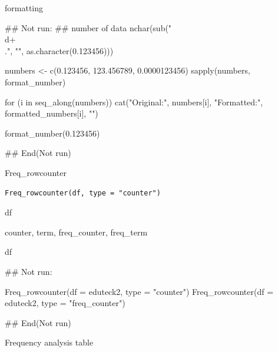 \documentclass[a4paper]{book}
\begin{document}
%
\begin{Value}
formatting
\end{Value}
%
\begin{Examples}
\begin{ExampleCode}
\#\# Not run: 
## number of data
nchar(sub("\\d+\\.", "", as.character(0.123456)))

numbers <- c(0.123456, 123.456789, 0.0000123456)
sapply(numbers, format_number)

for (i in seq_along(numbers)) {
   cat("Original:", numbers[i], "Formatted:", formatted_numbers[i], "\n")}

format_number(0.123456)


## End(Not run)

\end{ExampleCode}
\end{Examples}
%
\begin{Description}
Freq\_rowcounter
\end{Description}
%
\begin{Usage}
\begin{verbatim}
Freq_rowcounter(df, type = "counter")
\end{verbatim}
\end{Usage}
%
\begin{Arguments}
\begin{ldescription}
\item[\code{df}] df

\item[\code{type}] counter, term, freq\_counter, freq\_term
\end{ldescription}
\end{Arguments}
%
\begin{Value}
df
\end{Value}
%
\begin{Examples}
\begin{ExampleCode}
\#\# Not run: 

 Freq_rowcounter(df = eduteck2, type = "counter")
Freq_rowcounter(df = eduteck2, type = "freq_counter")

## End(Not run)
\end{ExampleCode}
\end{Examples}
%
\begin{Description}
Frequency analysis table
\end{Description}
\end{document}

